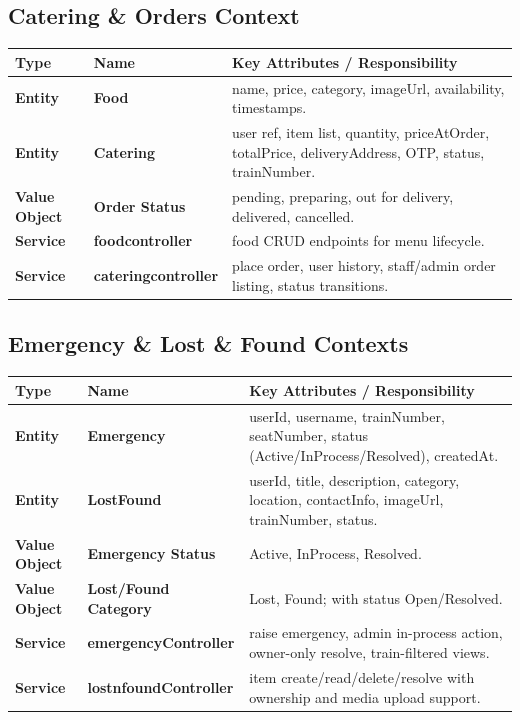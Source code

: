 \documentclass[12pt,a4paper]{report}
\renewcommand{\toprule}{\hline\hline}
\renewcommand{\midrule}{\hline}
\renewcommand{\bottomrule}{\hline\hline}
\begin{document}
\subsection{Catering \& Orders Context}
\begin{table}[H]
\centering
\begin{tabularx}{\textwidth}{>{\bfseries}p{} >{\bfseries}p{} Y}
\toprule
{}
\textcolor{TableHeaderText}{Type} & \textcolor{TableHeaderText}{Name} & \textcolor{TableHeaderText}{Key Attributes / Responsibility} \\
\midrule
Entity & Food & name, price, category, imageUrl, availability, timestamps. \\
Entity & Catering & user ref, item list, quantity, priceAtOrder, totalPrice, deliveryAddress, OTP, status, trainNumber. \\
Value Object & Order Status & pending, preparing, out for delivery, delivered, cancelled. \\
Service & foodcontroller & food CRUD endpoints for menu lifecycle. \\
Service & cateringcontroller & place order, user history, staff/admin order listing, status transitions. \\
\bottomrule
\end{tabularx}
\end{table}

\subsection{Emergency \& Lost \& Found Contexts}
\begin{table}[H]
\centering
\begin{tabularx}{\textwidth}{>{\bfseries}p{} >{\bfseries}p{} Y}
\toprule
{}
\textcolor{TableHeaderText}{Type} & \textcolor{TableHeaderText}{Name} & \textcolor{TableHeaderText}{Key Attributes / Responsibility} \\
\midrule
Entity & Emergency & userId, username, trainNumber, seatNumber, status (Active/InProcess/Resolved), createdAt. \\
Entity & LostFound & userId, title, description, category, location, contactInfo, imageUrl, trainNumber, status. \\
Value Object & Emergency Status & Active, InProcess, Resolved. \\
Value Object & Lost/Found Category & Lost, Found; with status Open/Resolved. \\
Service & emergencyController & raise emergency, admin in-process action, owner-only resolve, train-filtered views. \\
Service & lostnfoundController & item create/read/delete/resolve with ownership and media upload support. \\
\bottomrule
\end{tabularx}
\end{table}
\end{document}
